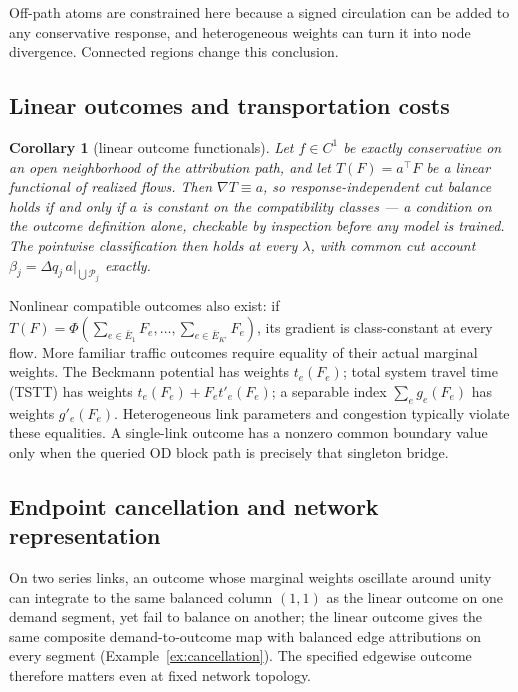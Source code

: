 \documentclass[a4paper,fleqn]{cas-sc}
\newtheorem{corollary}[theorem]{Corollary}
\begin{document}
Off-path atoms are constrained here because a signed circulation can
be added to any conservative response, and heterogeneous weights can turn
it into node divergence. Connected regions change this conclusion.




\subsection{Linear outcomes and transportation costs}\label{sec:transport}
\begin{corollary}[linear outcome functionals]\label{cor:linear}
Let $f\in C^1$ be exactly conservative on an open neighborhood of the
attribution path, and let $T(F)=a^\top F$ be a linear functional of
realized flows. Then $\nabla T\equiv a$, so response-independent
cut balance holds if and
only if $a$ is constant on the compatibility classes --- a
condition on the outcome definition alone, checkable by
inspection before any model is trained. The pointwise classification
then holds at every $\lambda$, with common cut account
$\beta_j=\Delta q_j\,a|_{\bigcup\mathcal{P}_j}$ exactly.
\end{corollary}

Nonlinear compatible outcomes also exist: if
$T(F)=\Phi(\sum_{e\in\bar E_1}F_e,\ldots,\sum_{e\in\bar E_{K'}}F_e)$,
its gradient is class-constant at every flow. More familiar traffic outcomes
require equality of their actual marginal weights. The Beckmann potential
has weights $t_e(F_e)$; total system travel time (TSTT) has weights
$t_e(F_e)+F_et'_e(F_e)$; a separable index $\sum_e g_e(F_e)$ has
weights $g'_e(F_e)$. Heterogeneous link parameters and congestion typically
violate these equalities. A single-link outcome has a nonzero common boundary value
only when the queried OD block path is precisely that singleton bridge.

\subsection{Endpoint cancellation and network representation}\label{sec:cancellation}
On two series links, an outcome whose marginal weights oscillate around
unity can integrate to the same balanced column $(1,1)$ as the linear
outcome on one demand segment, yet fail to balance on another; the
linear outcome gives the same composite demand-to-outcome map with
balanced edge attributions on every segment
(Example~\ref{ex:cancellation}). The specified edgewise outcome
therefore matters even at fixed network topology.
\end{document}
